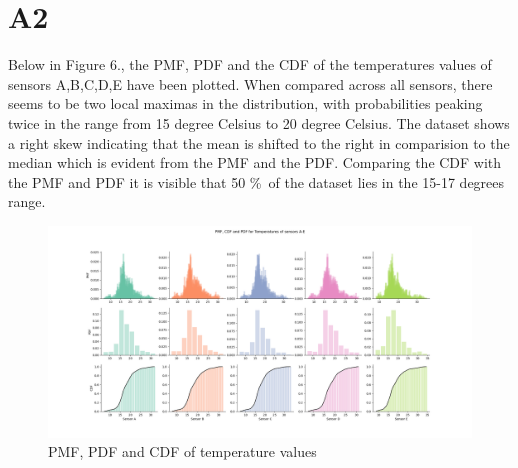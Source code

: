 \documentclass[a4paper]{article}
\begin{document}
\newpage
\section{A2}
Below in Figure 6., the PMF, PDF and the CDF of the temperatures values of sensors A,B,C,D,E have been plotted. When compared across all sensors, there seems to be two local maximas in the distribution, with probabilities peaking twice in the range from 15 degree Celsius to 20 degree Celsius. The dataset shows a right skew indicating that the mean is shifted to the right in comparision to the median which is evident from the PMF and the PDF. Comparing the CDF with the PMF and PDF it is visible that 50 \%\ of the dataset lies in the 15-17 degrees range.

\begin{figure}[H]
\includegraphics[width=17cm]{images/a2_1.png}
\centering
\caption{PMF, PDF and CDF of temperature values}
\end{figure}
\end{document}
